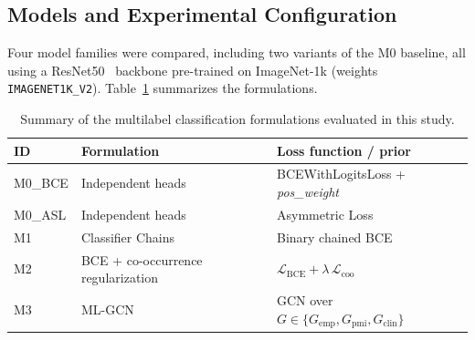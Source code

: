 \documentclass[12pt]{article}
\begin{document}

\subsection{Models and Experimental Configuration}

Four model families were compared, including two variants of the M0 baseline, all using a ResNet50~\cite{He2016} backbone pre-trained on ImageNet-1k (weights \texttt{IMAGENET1K\_V2}). Table~\ref{tab:modelos} summarizes the formulations.

\begin{table}[H]
\centering
\caption{Summary of the multilabel classification formulations evaluated in this study.}
\label{tab:modelos}
{\small
\begin{tabular}{lll}
\hline
\textbf{ID} & \textbf{Formulation} & \textbf{Loss function / prior} \\
\hline
M0\_BCE & Independent heads & BCEWithLogitsLoss + \textit{pos\_weight} \\
M0\_ASL & Independent heads & Asymmetric Loss~\cite{Ridnik2021} \\
M1 & Classifier Chains~\cite{Read2011} & Binary chained BCE \\
M2 & BCE + co-occurrence regularization & $\mathcal{L}_{\text{BCE}} + \lambda\,\mathcal{L}_{\text{coo}}$ \\
M3 & ML-GCN~\cite{Chen2019} & GCN over $G \in \{G_{\text{emp}}, G_{\text{pmi}}, G_{\text{clin}}\}$ \\
\hline
\end{tabular}
}
\end{table}
\end{document}
